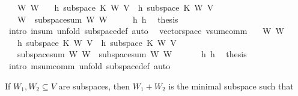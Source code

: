 \begin{isabellebody}
\ \ \ W{}\ W{}\isanewline
\ \ \ h{}{\isacharcolon}\ {\isachardoublequoteopen}subspace\ K\ W{}\ V{\isachardoublequoteclose}\ \ h{}{\isacharcolon}\ {\isachardoublequoteopen}subspace\ K\ W{}\ V{\isachardoublequoteclose}\isanewline
\ \ \ {\isachardoublequoteopen}W{}\ {\isasymsubseteq}\ subspace{\isacharunderscore}sum\ W{}\ W{}{\isachardoublequoteclose}\isanewline
%
\isadelimproof
%
\endisadelimproof
%
\isatagproof
{}\isamarkupfalse%
\ {\isacharminus}\isanewline
\ \ \isamarkupfalse%
\ h{}\ h{}\ \isamarkupfalse%
\ {\isacharquery}thesis\ \isamarkupfalse%
\ {\isacharparenleft}intro\ in{\isacharunderscore}sum{\isacharcomma}\ unfold\ subspace{\isacharunderscore}def{\isacharcomma}\ auto{\isacharparenright}\isanewline
{}\isamarkupfalse%
%
\endisatagproof
{\isafoldproof}%
%
\isadelimproof
\isanewline
%
\endisadelimproof
\isanewline
{}\isamarkupfalse%
\ {\isacharparenleft}\ vectorspace{\isacharparenright}\ vsum{\isacharunderscore}comm{\isacharcolon}\isanewline
\ \ \ W{}\ W{}\isanewline
\ \ \ h{}{\isacharcolon}\ {\isachardoublequoteopen}subspace\ K\ W{}\ V{\isachardoublequoteclose}\ \ h{}{\isacharcolon}\ {\isachardoublequoteopen}subspace\ K\ W{}\ V{\isachardoublequoteclose}\isanewline
\ \ \ {\isachardoublequoteopen}{\isacharparenleft}subspace{\isacharunderscore}sum\ W{}\ W{}{\isacharparenright}\ {\isacharequal}\ {\isacharparenleft}subspace{\isacharunderscore}sum\ W{}\ W{}{\isacharparenright}{\isachardoublequoteclose}\isanewline
%
\isadelimproof
%
\endisadelimproof
%
\isatagproof
{}\isamarkupfalse%
\ {\isacharminus}\ \isanewline
\ \ \isamarkupfalse%
\ h{}\ h{}\ \isamarkupfalse%
\ {\isacharquery}thesis\ \isamarkupfalse%
\ {\isacharparenleft}intro\ msum{\isacharunderscore}comm{\isacharcomma}\ unfold\ subspace{\isacharunderscore}def{\isacharcomma}\ auto{\isacharparenright}\isanewline
{}\isamarkupfalse%
%
\endisatagproof
{\isafoldproof}%
%
\isadelimproof
%
\endisadelimproof
%
\begin{isamarkuptext}%
If $W_1,W_2\subseteq V$ are subspaces, then $W_1+W_2$ is the minimal subspace such that 

\end{isamarkuptext}
\end{isabellebody}

